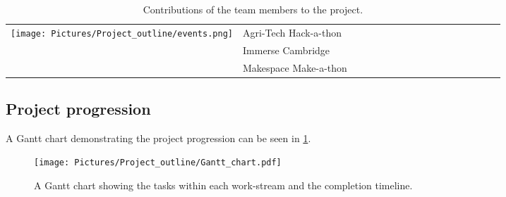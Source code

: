 \begin{table}[h]
{\begin{tabular}{l l c c c c c c c c c c c c c c c}
\midrule
\texttt{[image: Pictures/Project\_outline/events.png]} & \small Agri-Tech Hack-a-thon & & & & \cellcolor{green!25}& \cellcolor{green!25} & & & \cellcolor{green!25} & & & & & \cellcolor{green!25} & & \cellcolor{green!25} \\
& \small Immerse Cambridge & \cellcolor{green!25} & \cellcolor{green!25} & \cellcolor{green!25} & & \cellcolor{green!25} & & & \cellcolor{green!25} & \cellcolor{green!25} & & & & & & \\
& \small Makespace Make-a-thon & & \cellcolor{green!25} & & \cellcolor{green!25} & & \cellcolor{green!25} & \cellcolor{green!25} & \cellcolor{green!25} & & \cellcolor{green!25} & & & & & \\
\bottomrule
\end{tabular}
}
\caption{Contributions of the team members to the project.}
\label{tab:tasks}
\end{table}




\clearpage
\subsection{Project progression}\label{project_progression}
A Gantt chart demonstrating the project progression can be seen in \cref{fig:gantt}.

\begin{figure}[H]
    \centering
    \texttt{[image: Pictures/Project\_outline/Gantt\_chart.pdf]}
    \captionsetup{justification=centering}
    \caption{A Gantt chart showing the tasks within each work-stream and the completion timeline.}
    \label{fig:gantt}
\end{figure}

